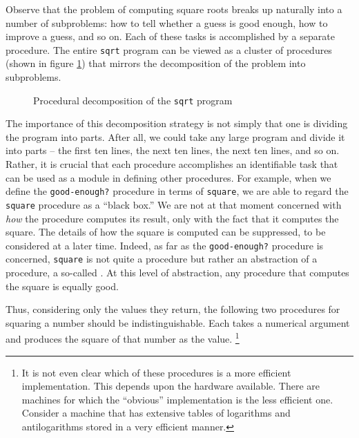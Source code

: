 \begin{schemedisplay}
Observe that the problem of computing square roots breaks up naturally
into a number of subproblems: how to tell whether a guess is good
enough, how to improve a guess, and so on.  Each of these tasks is
accomplished by a separate procedure.  The entire \texttt{sqrt} program
can be viewed as a cluster of procedures (shown in
figure \ref{fig:1.2}) that mirrors the decomposition of
the problem into subproblems.

\begin{figure}
  \caption{Procedural decomposition of the \texttt{sqrt} program}
  \label{fig:1.2}
\end{figure}
          
            
The importance of this decomposition strategy is not simply that one
is dividing the program into parts.  After all, we could take any
large program and divide it into parts -- the first ten lines, the next
ten lines, the next ten lines, and so on.  Rather, it is crucial that
each procedure accomplishes an identifiable task that can be used as a
module in defining other procedures.  For example, when we define the
\texttt{good-enough?} procedure in terms of \texttt{square}, we are able to
regard the \texttt{square} procedure as a ``black box.''  We are not at
that moment concerned with \textit{how} the procedure computes its
result, only with the fact that it computes the square.  The details
of how the square is computed can be suppressed, to be considered at a
later time.  Indeed, as far as the \texttt{good-enough?} procedure is
concerned, \texttt{square} is not quite a procedure but rather an
abstraction of a procedure, a so-called .
At this level of abstraction, any procedure that computes the square
is equally good.

Thus, considering only the values they return, the following two
procedures for squaring a number should be indistinguishable.  Each
takes a numerical argument and produces the square of that number as
the value. \footnote{It is not even clear which of these procedures is
  a more efficient implementation.  This depends upon the hardware
  available.  There are machines for which the ``obvious''
  implementation is the less efficient one.  Consider a machine that
  has extensive tables of logarithms and antilogarithms stored in a
  very efficient manner.}


\end{schemedisplay}
